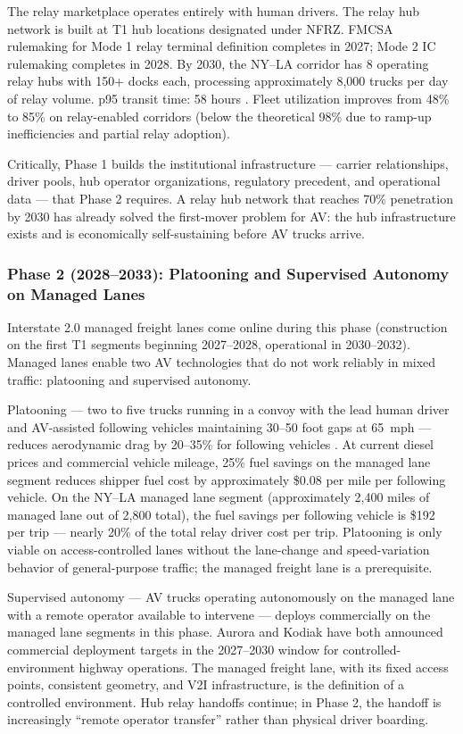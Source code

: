 The relay marketplace operates entirely with human drivers. The relay hub network is built at
T1 hub locations designated under NFRZ. FMCSA rulemaking for Mode 1 relay terminal definition
completes in 2027; Mode 2 IC rulemaking completes in 2028. By 2030, the NY--LA corridor has
8 operating relay hubs with 150+ docks each, processing approximately 8,000 trucks per day of
relay volume. p95 transit time: 58 hours \citep{ROUTE_C1}. Fleet utilization improves from
48\% to 85\% on relay-enabled corridors (below the theoretical 98\% due to ramp-up
inefficiencies and partial relay adoption).

Critically, Phase 1 builds the institutional infrastructure --- carrier relationships, driver
pools, hub operator organizations, regulatory precedent, and operational data --- that Phase 2
requires. A relay hub network that reaches 70\% penetration by 2030 has already solved the
first-mover problem for AV: the hub infrastructure exists and is economically self-sustaining
before AV trucks arrive.

\subsubsection*{Phase 2 (2028--2033): Platooning and Supervised Autonomy on Managed Lanes}

Interstate 2.0 managed freight lanes come online during this phase (construction on the first
T1 segments beginning 2027--2028, operational in 2030--2032). Managed lanes enable two AV
technologies that do not work reliably in mixed traffic: platooning and supervised autonomy.

Platooning --- two to five trucks running in a convoy with the lead human driver and AV-assisted
following vehicles maintaining 30--50 foot gaps at 65~mph --- reduces aerodynamic drag by
20--35\% for following vehicles \citep{ROUTE_E1}. At current diesel prices and commercial
vehicle mileage, 25\% fuel savings on the managed lane segment reduces shipper fuel cost by
approximately \$0.08 per mile per following vehicle. On the NY--LA managed lane segment
(approximately 2,400 miles of managed lane out of 2,800 total), the fuel savings per following
vehicle is \$192 per trip --- nearly 20\% of the total relay driver cost per trip. Platooning
is only viable on access-controlled lanes without the lane-change and speed-variation behavior
of general-purpose traffic; the managed freight lane is a prerequisite.

Supervised autonomy --- AV trucks operating autonomously on the managed lane with a remote
operator available to intervene --- deploys commercially on the managed lane segments in this
phase. Aurora and Kodiak have both announced commercial deployment targets in the 2027--2030
window for controlled-environment highway operations. The managed freight lane, with its fixed
access points, consistent geometry, and V2I infrastructure, is the definition of a
controlled environment. Hub relay handoffs continue; in Phase 2, the handoff is increasingly
``remote operator transfer'' rather than physical driver boarding.

